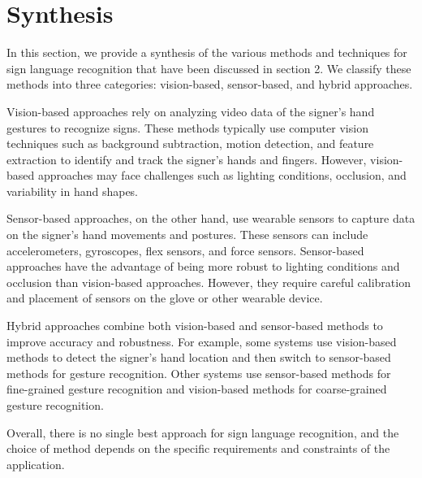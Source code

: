 \section{Synthesis}
In this section, we provide a synthesis of the various methods and techniques for sign language recognition that have been discussed in section 2. We classify these methods into three categories: vision-based, sensor-based, and hybrid approaches.

Vision-based approaches rely on analyzing video data of the signer's hand gestures to recognize signs. These methods typically use computer vision techniques such as background subtraction, motion detection, and feature extraction to identify and track the signer's hands and fingers. However, vision-based approaches may face challenges such as lighting conditions, occlusion, and variability in hand shapes.

Sensor-based approaches, on the other hand, use wearable sensors to capture data on the signer's hand movements and postures. These sensors can include accelerometers, gyroscopes, flex sensors, and force sensors. Sensor-based approaches have the advantage of being more robust to lighting conditions and occlusion than vision-based approaches. However, they require careful calibration and placement of sensors on the glove or other wearable device.

Hybrid approaches combine both vision-based and sensor-based methods to improve accuracy and robustness. For example, some systems use vision-based methods to detect the signer's hand location and then switch to sensor-based methods for gesture recognition. Other systems use sensor-based methods for fine-grained gesture recognition and vision-based methods for coarse-grained gesture recognition.

Overall, there is no single best approach for sign language recognition, and the choice of method depends on the specific requirements and constraints of the application.
